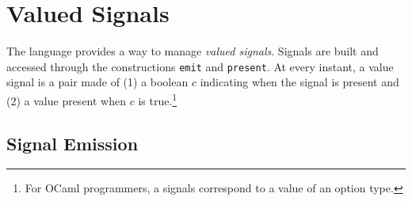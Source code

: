 \documentclass[11pt,titlepage,twoside]{report}
\newcommand{\ocaml}{{\sf OCaml}}
\begin{document}



\section{Valued Signals}
\label{signals}
The language provides a way to manage {\em valued signals}. Signals
are built and accessed through the constructions \verb-emit- and
\verb-present-.  At every instant, a value signal is a pair made of (1) a boolean
$c$ indicating when the signal is present and (2) a value present when $c$ is
true.\footnote{For \ocaml{} programmers, a signals correspond to a value
of an option type.}
 
\subsection{Signal Emission} %
\end{document}
